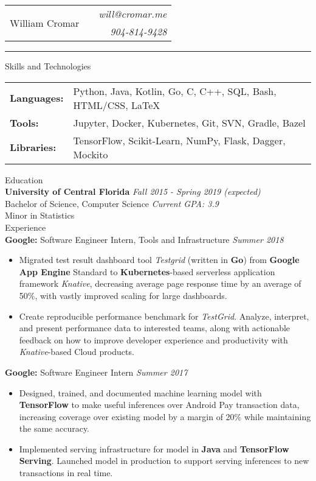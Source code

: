 \documentclass[letterpaper,11pt,oneside]{article}
\newcommand{\mkheader}[3]{
  {\fontfamily{pag}\selectfont
  \begin{tabularx}{\textwidth}{lXr}
    \multirow{2}{*}{\Huge #1} && \emph{#2}
    \\ && \emph{#3}
  \end{tabularx}
  }
  \vspace{2pt}
  \hrule
}
\newcommand{\resheader}[2][]{
  \vspace{9pt}
  {\LARGE #2} #1
  \\
}
\newcommand{\ressubheader}[3][]{
  \vspace{6pt}
  {\textbf{#2} #1} \hfill \emph{#3}
  \\
}
\newcommand{\resskill}[1]{\textbf{#1}}
\begin{document}
\mkheader{William Cromar}{will@cromar.me}{904-814-9428}

\resheader{Skills and Technologies}
\vspace{6pt}
\begin{tabular}{>{\bfseries}l@{\hskip .25cm} l}
  Languages: & Python, Java, Kotlin, Go, C, C++, SQL, Bash, HTML/CSS, LaTeX \\
  Tools: & Jupyter, Docker, Kubernetes, Git, SVN, Gradle, Bazel \\
  Libraries: & TensorFlow, Scikit-Learn, NumPy, Flask, Dagger, Mockito \\
\end{tabular}


\resheader{Education}
\ressubheader{University of Central Florida}{Fall 2015 - Spring 2019 (expected)}
Bachelor of Science, Computer Science \hfill \emph{Current GPA: 3.9} \\
Minor in Statistics \\

\resheader{Experience}
\ressubheader[Software Engineer Intern, Tools and Infrastructure]{Google:}{Summer 2018}
\begin{itemize}
  \item Migrated test result dashboard tool \emph{Testgrid} (written in \resskill{Go}) from \resskill{Google App Engine} Standard to \resskill{Kubernetes}-based serverless application framework \emph{Knative}, decreasing average page response time by an average of 50\%, with vastly improved scaling for large dashboards.
  \item Create reproducible performance benchmark for \emph{TestGrid}. Analyze, interpret, and present performance data to interested teams, along with actionable feedback on how to improve developer experience and productivity with \emph{Knative}-based Cloud products.
\end{itemize}

\ressubheader[Software Engineer Intern]{Google:}{Summer 2017}
\begin{itemize}
  \item Designed, trained, and documented machine learning model with \resskill{TensorFlow} to make useful inferences over Android Pay transaction data, increasing coverage over existing model by a margin of 20\% while maintaining the same accuracy.
  \item Implemented serving infrastructure for model in \resskill{Java} and \resskill{TensorFlow Serving}. Launched model in production to support serving inferences to new transactions in real time.
\end{itemize}
\end{document}
